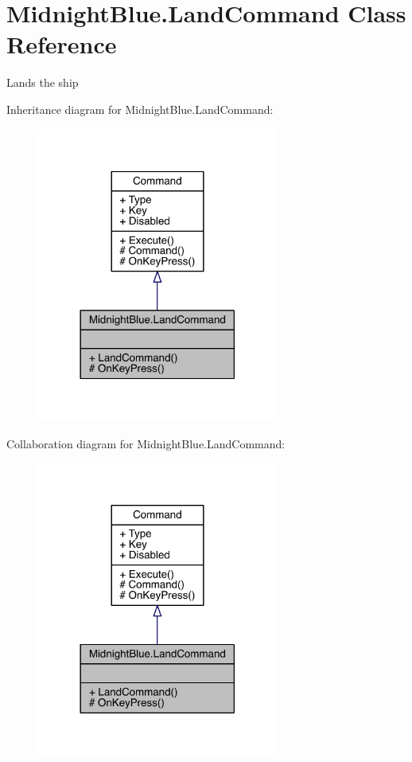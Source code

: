 \hypertarget{class_midnight_blue_1_1_land_command}{}\section{Midnight\+Blue.\+Land\+Command Class Reference}
\label{class_midnight_blue_1_1_land_command}


Lands the ship  




Inheritance diagram for Midnight\+Blue.\+Land\+Command\+:
\nopagebreak
\begin{figure}[H]
\begin{center}
\leavevmode
\includegraphics[width=225pt]{class_midnight_blue_1_1_land_command__inherit__graph}
\end{center}
\end{figure}


Collaboration diagram for Midnight\+Blue.\+Land\+Command\+:
\nopagebreak
\begin{figure}[H]
\begin{center}
\leavevmode
\includegraphics[width=225pt]{class_midnight_blue_1_1_land_command__coll__graph}
\end{center}
\end{figure}
